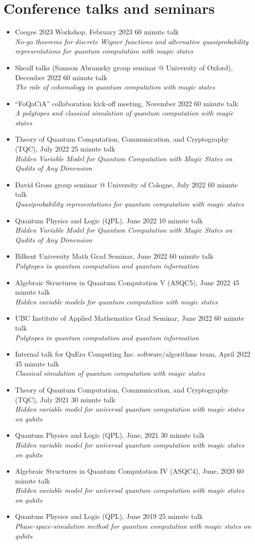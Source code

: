 \documentclass[letterpaper,11pt]{article}
\newcommand{\ConferenceItem}[3]{
	\item{\parbox{0.97\textwidth}{
		{#1}  \hfill {#2}\\
		\emph{#3}
	}}
}
\begin{document}
\section*{Conference talks and seminars}
\begin{itemize}[leftmargin=*]
	\ConferenceItem{Coogee 2023 Workshop, February 2023}{60 minute talk}{No-go theorems for discrete Wigner functions and alternative quasiprobability representations for quantum computation with magic states}
	
	\ConferenceItem{Shealf talks (Samson Abramsky group seminar @ University of Oxford), December 2022}{60 minute talk}{The role of cohomology in quantum computation with magic states}
	
	\ConferenceItem{``FoQaCiA'' collaboration kick-off meeting, November 2022}{60 minute talk}{$\Lambda$ polytopes and classical simulation of quantum computation with magic states}
	
	\ConferenceItem{Theory of Quantum Computation, Communication, and Cryptography (TQC), July 2022}{25 minute talk}{Hidden Variable Model for Quantum Computation with Magic States on Qudits of Any Dimension}
	
	\ConferenceItem{David Gross group seminar @ University of Cologne, July 2022}{60 minute talk}{Quasiprobability representations for quantum computation with magic states}
	
	\ConferenceItem{Quantum Physics and Logic (QPL), June 2022}{10 minute talk}{Hidden Variable Model for Quantum Computation with Magic States on Qudits of Any Dimension}
	
	\ConferenceItem{Bilkent University Math Grad Seminar, June 2022}{60 minute talk}{Polytopes in quantum computation and quantum information}
	
	\ConferenceItem{Algebraic Structures in Quantum Computation V (ASQC5), June 2022}{45 minute talk}{Hidden variable models for quantum computation with magic states}
	
	\ConferenceItem{UBC Institute of Applied Mathematics Grad Seminar, June 2022}{60 minute talk}{Polytopes in quantum computation and quantum information}
	
	\ConferenceItem{Internal talk for QuEra Computing Inc. software/algorithms team, April 2022}{45 minute talk}{Classical simulation of quantum computation with magic states}
	
	\ConferenceItem{Theory of Quantum Computation, Communication, and Cryptography (TQC), July 2021}{30 minute talk}{Hidden variable model for universal quantum computation with magic states on qubits}
	
	\ConferenceItem{Quantum Physics and Logic (QPL), June, 2021}{30 minute talk}{Hidden variable model for universal quantum computation with magic states on qubits}
	
	\ConferenceItem{Algebraic Structures in Quantum Computation IV (ASQC4), June, 2020}{60 minute talk}{Hidden variable model for universal quantum computation with magic states on qubits}
	
	\ConferenceItem{Quantum Physics and Logic (QPL), June 2019}{25 minute talk}{Phase-space-simulation method for quantum computation with magic states on qubits}
\end{itemize}
\end{document}
